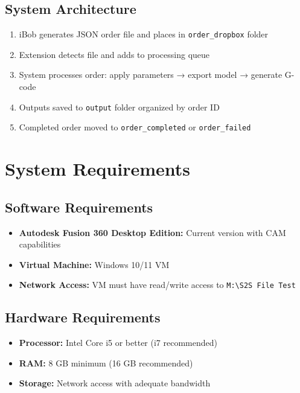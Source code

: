 \documentclass[11pt,letterpaper]{article}
\begin{document}
\subsection{System Architecture}

\begin{tcolorbox}[colback=blue!5!white,colframe=blue!75!black,title=Processing Flow]
\begin{enumerate}[noitemsep]
    \item iBob generates JSON order file and places in \texttt{order\_dropbox} folder
    \item Extension detects file and adds to processing queue
    \item System processes order: apply parameters → export model → generate G-code
    \item Outputs saved to \texttt{output} folder organized by order ID
    \item Completed order moved to \texttt{order\_completed} or \texttt{order\_failed}
\end{enumerate}
\end{tcolorbox}

\section{System Requirements}

\subsection{Software Requirements}

\begin{itemize}
    \item \textbf{Autodesk Fusion 360 Desktop Edition:} Current version with CAM capabilities
    \item \textbf{Virtual Machine:} Windows 10/11 VM
    \item \textbf{Network Access:} VM must have read/write access to \texttt{M:\textbackslash S2S File Test}
\end{itemize}

\subsection{Hardware Requirements}

\begin{itemize}
    \item \textbf{Processor:} Intel Core i5 or better (i7 recommended)
    \item \textbf{RAM:} 8 GB minimum (16 GB recommended)
    \item \textbf{Storage:} Network access with adequate bandwidth
\end{itemize}
\end{document}
